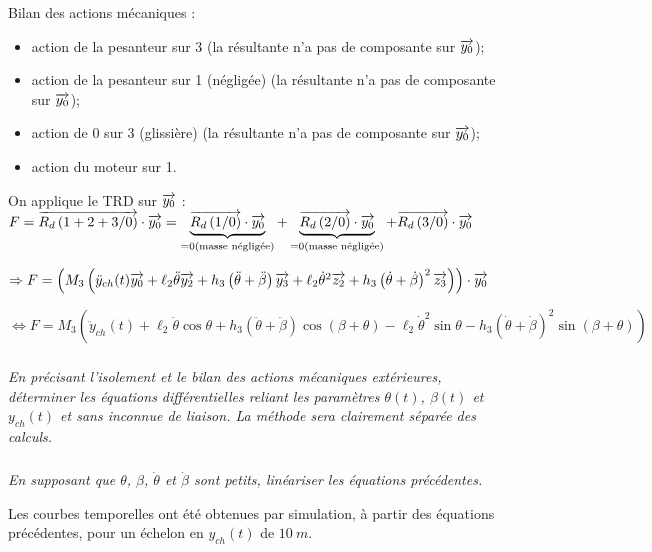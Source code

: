 \documentclass[10pt,fleqn]{article} %
\begin{document}
\begin{multicols}{2}
\begin{corrige}
Bilan des actions mécaniques : 
\begin{itemize}
\item action de la pesanteur sur 3 (la résultante n'a pas de composante sur $\overrightarrow{y_0}$);
\item action de la pesanteur sur 1 (négligée) (la résultante n'a pas de composante sur $\overrightarrow{y_0}$);
\item action de 0 sur 3 (glissière) (la résultante n'a pas de composante sur $\overrightarrow{y_0}$);
\item action du moteur sur 1.
\end{itemize}

On applique le TRD sur $\overrightarrow{y_0}$ :
$F = \overrightarrow{R_d \left( {1+2+3}/ {0}\right)}\cdot \overrightarrow{y_0}= \underbrace{\overrightarrow{R_d \left( {1}/ {0}\right)} \cdot  \overrightarrow{y_0}}_{=0 \text{(masse négligée)}}+ \underbrace{\overrightarrow{R_d \left( {2}/ {0}\right)}\cdot  \overrightarrow{y_0}}_{=0 \text{(masse négligée)}} + \overrightarrow{R_d \left( {3}/ {0}\right)}\cdot \overrightarrow{y_0}$

 $ \Rightarrow F = \left( M_3\left(\ddot{y}_{ch}(t) \overrightarrow{y_0}+\ell_2\ddot{\theta} \overrightarrow{y_2}+h_3\left(\ddot{\theta}+\ddot{\beta}\right) \overrightarrow{y_3}
+   
\ell_2\dot{\theta}^2 \overrightarrow{z_2}  +h_3\left(\dot{\theta}+\dot{\beta}\right)^2\overrightarrow{z_3}\right)\right) \cdot \overrightarrow{y_0}$

 $ \Leftrightarrow F =  M_3\left(\ddot{y}_{ch}(t) +\ell_2\ddot{\theta} \cos \theta +h_3\left(\ddot{\theta}+\ddot{\beta}\right) \cos \left( \beta+\theta\right)
-
\ell_2\dot{\theta}^2 \sin \theta   -h_3\left(\dot{\theta}+\dot{\beta}\right)^2  \sin \left( \beta+\theta\right)\right) $
\end{corrige}
\else
\fi


\subparagraph{}
\textit{En précisant l’isolement et le bilan des actions mécaniques extérieures, déterminer les équations différentielles
reliant les paramètres $\theta(t)$, $\beta(t)$  et $y_{ch}(t)$ et sans inconnue de liaison. La méthode sera clairement séparée des calculs.}
\ifprof
\begin{corrige}
\end{corrige}
\else
\fi


\subparagraph{}
\textit{En supposant que $\theta$, $\beta$, $\dot{\theta}$ et $\dot{\beta}$ sont petits, linéariser les équations précédentes.  }
\ifprof
\begin{corrige}
\end{corrige}
\else
\fi


Les courbes temporelles ont été obtenues par simulation, à partir des équations précédentes, pour un
échelon en $y_{ch}(t)$ de $\SI{10}{m}$. 



\end{multicols}
\end{document}
